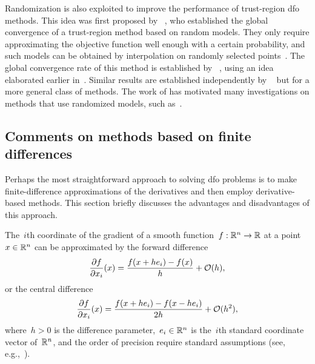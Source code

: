 Randomization is also exploited to improve the performance of trust-region \gls{dfo} methods.
This idea was first proposed by \citeauthor{Bandeira_Scheinberg_Vicente_2012}~\cite{Bandeira_Scheinberg_Vicente_2012}, who established the global convergence of a trust-region method based on random models.
They only require approximating the objective function well enough with a certain probability, and such models can be obtained by interpolation on randomly selected points~\cite{Bandeira_Scheinberg_Vicente_2014}.
The global convergence rate of this method is established by \citeauthor{Gratton_Etal_2018}~\cite{Gratton_Etal_2018}, using an idea elaborated earlier in~\cite[\S~6]{Gratton_Etal_2015}.
Similar results are established independently by \citeauthor{Cartis_Scheinberg_2018}~\cite{Cartis_Scheinberg_2018} but for a more general class of methods.
The work of \citeauthor{Bandeira_Scheinberg_Vicente_2012} has motivated many investigations on methods that use randomized models, such as~\cite{Chen_Menickelly_Scheinberg_2018}.

\subsection{Comments on methods based on finite differences}
\label{subsec:finite-difference}

Perhaps the most straightforward approach to solving \gls{dfo} problems is to make finite-difference approximations of the derivatives and then employ derivative-based methods.
This section  briefly discusses the advantages and disadvantages of this approach.

The~$i$th coordinate of the gradient of a smooth function~$f : \mathbb{R}^n \to \mathbb{R}$ at a point~$\iter \in \R^n$ can be approximated by the forward difference
\begin{equation}
    \label{eq:forward-difference}
    \frac{\partial \obj}{\partial x_i}(\iter) = \frac{\obj(\iter + h e_i) - \obj(\iter)}{h} + \bigo(h),
\end{equation}
or the central difference
\begin{equation}
    \label{eq:central-difference}
    \frac{\partial \obj}{\partial x_i}(\iter) = \frac{\obj(\iter + h e_i) - \obj(\iter - h e_i)}{2h} + \bigo(h^2),
\end{equation}
where~$h > 0$ is the difference parameter,~$e_i \in \mathbb{R}^n$ is the~$i$th standard coordinate vector of~$\mathbb{R}^n$, and the order of precision require standard assumptions (see, e.g.,~\cite[\S~8.1]{Nocedal_Wright_2006}).

